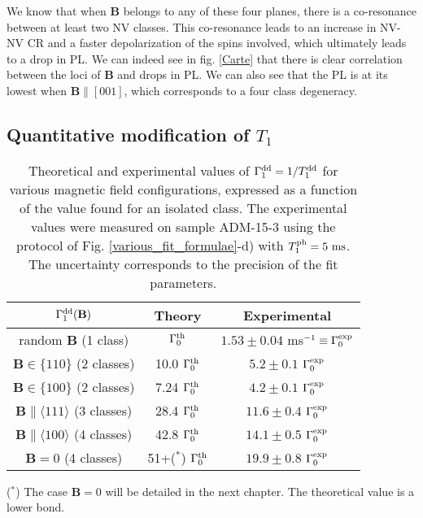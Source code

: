 \documentclass[a4paper, 11pt]{book}
\begin{document}
We know that when $\mathbf{B}$ belongs to any of these four planes, there is a co-resonance between at least two NV classes. This co-resonance leads to an increase in NV-NV CR and a faster depolarization of the spins involved, which ultimately leads to a drop in PL. We can indeed see in fig. \ref{Carte} that there is clear correlation between the loci of $\mathbf{B}$ and drops in PL. We can also see that the PL is at its lowest when $\mathbf{B}\parallel [001]$, which corresponds to a four class degeneracy.

\subsection{Quantitative modification of $T_1$}
\label{sec quantitative T1}
\begin{table}[htbp]
\centering
\caption{Theoretical and experimental values of $\Gamma_1^{\rm dd}=1/T_1^{\rm dd}$ for various magnetic field configurations, expressed as a function of the value found for an isolated class. The experimental values were measured on sample ADM-15-3 using the protocol of Fig. \ref{various_fit_formulae}-d) with $T_1^{\rm ph}= 5\ \rm ms$. The uncertainty corresponds to the precision of the fit parameters.}
 \label{T1 champ mag}
\begin{tabular}{c|cc}
\toprule
$\Gamma_1^{\rm dd} (\mathbf{B})$ &  Theory & Experimental \\
\midrule
random $\mathbf{B}$ (1 class) & $\Gamma_0^{\rm th}$ & $1.53\pm 0.04$ ms$^{-1} \equiv \Gamma_0^{\rm exp}$ \\
$\mathbf{B} \in \{110\}$ (2 classes) & 10.0 $\Gamma_0^{\rm th}$ & $5.2 \pm 0.1$ $\Gamma_0^{\rm exp}$ \\
$\mathbf{B} \in \{100\}$ (2 classes) & 7.24 $\Gamma_0^{\rm th}$ & $4.2 \pm 0.1$ $\Gamma_0^{\rm exp}$ \\
$\mathbf{B} \parallel \langle 111 \rangle$ (3 classes) & 28.4 $\Gamma_0^{\rm th}$ & $11.6 \pm 0.4$ $\Gamma_0^{\rm exp}$ \\
$\mathbf{B} \parallel \langle 100 \rangle$ (4 classes) & 42.8 $\Gamma_0^{\rm th}$ & $14.1 \pm 0.5$ $\Gamma_0^{\rm exp}$ \\
$\mathbf{B}=0$ (4 classes) & 51+($^*$) $\Gamma_0^{\rm th}$ & $19.9 \pm 0.8$ $\Gamma_0^{\rm exp}$ \\
\bottomrule
\end{tabular}

($^*$) The case $\mathbf{B}=0$ will be detailed in the next chapter. The theoretical value is a lower bond.
\end{table}
\end{document}
